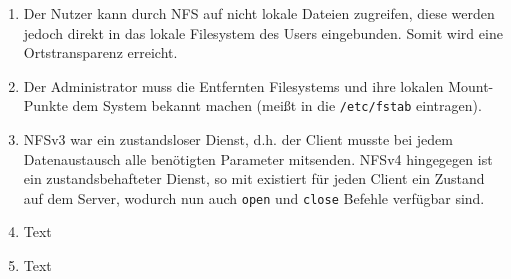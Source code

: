 \documentclass[german,12pt,a4paper]{article}
\begin{document}
\begin{enumerate}

	\item Der Nutzer kann durch NFS auf nicht lokale Dateien zugreifen, diese werden jedoch direkt in
		das lokale Filesystem des Users eingebunden. Somit wird eine Ortstransparenz erreicht.
	
	\item Der Administrator muss die Entfernten Filesystems und ihre lokalen Mount-Punkte dem System
		bekannt machen (meißt in die \texttt{/etc/fstab} eintragen).
	
	\item NFSv3 war ein zustandsloser Dienst, d.h. der Client musste bei jedem Datenaustausch alle
		benötigten Parameter mitsenden. NFSv4 hingegegen ist ein zustandsbehafteter Dienst, so mit
		existiert für jeden Client ein Zustand auf dem Server, wodurch nun auch \texttt{open} und
		\texttt{close} Befehle verfügbar sind.
	
	\item Text
	
	\item Text

\end{enumerate}
\end{document}

